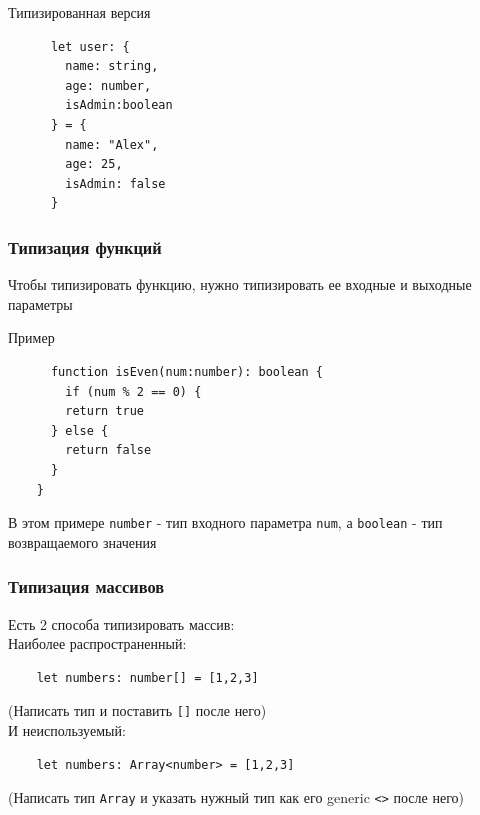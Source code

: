 \documentclass[aspectratio=169]{beamer}
\begin{document}
\begin{frame}[fragile]

  \begin{block}{Типизированная версия}
    \begin{verbatim}
      let user: {
        name: string,
        age: number,
        isAdmin:boolean
      } = {
        name: "Alex",
        age: 25,
        isAdmin: false
      }
    \end{verbatim}
  \end{block}
\end{frame}


\begin{frame}[fragile]

  \frametitle{Типизация функций}

  Чтобы типизировать функцию, нужно типизировать ее входные и выходные параметры

  \begin{block}{Пример}
    \begin{verbatim}
      function isEven(num:number): boolean {
        if (num % 2 == 0) {
        return true
      } else {
        return false
      }
    }
  \end{verbatim}
\end{block}

В этом примере \texttt{number} - тип входного параметра \texttt{num}, а \texttt{boolean} - тип возвращаемого значения

\end{frame}

\begin{frame}[fragile]

  \frametitle{Типизация массивов}

  Есть 2 способа типизировать массив: \\
  Наиболее распространенный: \\ 
  \begin{verbatim}
    let numbers: number[] = [1,2,3] 
  \end{verbatim}
  (Написать тип и поставить \texttt{[]} после него) \\

  И неиспользуемый: \\
  \begin{verbatim}
    let numbers: Array<number> = [1,2,3] 
  \end{verbatim}
  (Написать тип \texttt{Array} и указать нужный тип как его generic \texttt{<>} после него)  
  
  
  
\end{frame}
\end{document}
